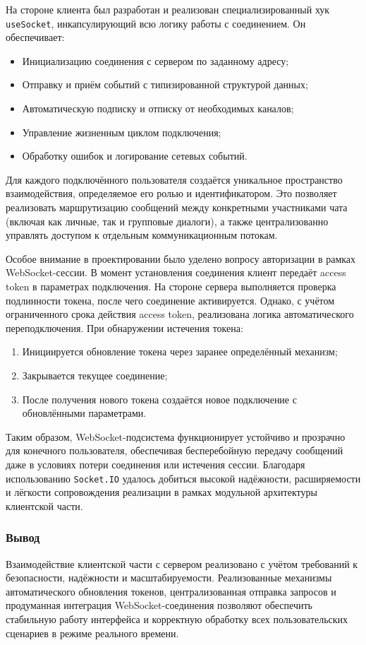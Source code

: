 На стороне клиента был разработан и реализован специализированный хук \texttt{useSocket}, инкапсулирующий всю логику работы с соединением. Он обеспечивает:
\begin{itemize}
  \item Инициализацию соединения с сервером по заданному адресу;
  \item Отправку и приём событий с типизированной структурой данных;
  \item Автоматическую подписку и отписку от необходимых каналов;
  \item Управление жизненным циклом подключения;
  \item Обработку ошибок и логирование сетевых событий.
\end{itemize}

Для каждого подключённого пользователя создаётся уникальное пространство взаимодействия, определяемое его ролью и идентификатором. Это позволяет реализовать маршрутизацию сообщений между конкретными участниками чата (включая как личные, так и групповые диалоги), а также централизованно управлять доступом к отдельным коммуникационным потокам.

Особое внимание в проектировании было уделено вопросу авторизации в рамках WebSocket-сессии. В момент установления соединения клиент передаёт access token в параметрах подключения. На стороне сервера выполняется проверка подлинности токена, после чего соединение активируется. Однако, с учётом ограниченного срока действия access token, реализована логика автоматического переподключения. При обнаружении истечения токена:
\begin{enumerate}
  \item Инициируется обновление токена через заранее определённый механизм;
  \item Закрывается текущее соединение;
  \item После получения нового токена создаётся новое подключение с обновлёнными параметрами.
\end{enumerate}

Таким образом, WebSocket-подсистема функционирует устойчиво и прозрачно для конечного пользователя, обеспечивая бесперебойную передачу сообщений даже в условиях потери соединения или истечения сессии. Благодаря использованию \texttt{Socket.IO} удалось добиться высокой надёжности, расширяемости и лёгкости сопровождения реализации в рамках модульной архитектуры клиентской части.

\subsubsection{Вывод}

Взаимодействие клиентской части с сервером реализовано с учётом требований к безопасности, надёжности и масштабируемости. Реализованные механизмы автоматического обновления токенов, централизованная отправка запросов и продуманная интеграция WebSocket-соединения позволяют обеспечить стабильную работу интерфейса и корректную обработку всех пользовательских сценариев в режиме реального времени.
